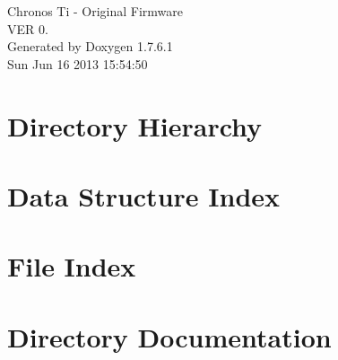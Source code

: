 \documentclass[a4paper]{book}
\begin{document}
\hypersetup{pageanchor=false,citecolor=blue}
\begin{titlepage}
\vspace*{7cm}
\begin{center}
{\Large \-Chronos \-Ti -\/ \-Original \-Firmware \\[1ex]\large \-V\-E\-R 0. }\\
\vspace*{1cm}
{\large \-Generated by Doxygen 1.7.6.1}\\
\vspace*{0.5cm}
{\small Sun Jun 16 2013 15:54:50}\\
\end{center}
\end{titlepage}
\clearemptydoublepage
{}
\tableofcontents
\clearemptydoublepage
{}
\hypersetup{pageanchor=true,citecolor=blue}
\chapter{\-Directory \-Hierarchy}

\chapter{\-Data \-Structure \-Index}

\chapter{\-File \-Index}

\chapter{\-Directory \-Documentation}


























\end{document}
